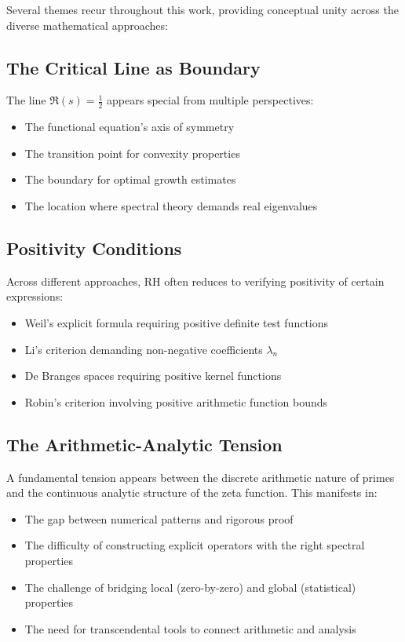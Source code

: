 Several themes recur throughout this work, providing conceptual unity across the diverse mathematical approaches:

\subsection*{The Critical Line as Boundary}

The line $\Re(s) = \frac{1}{2}$ appears special from multiple perspectives:
\begin{itemize}
\item The functional equation's axis of symmetry
\item The transition point for convexity properties
\item The boundary for optimal growth estimates
\item The location where spectral theory demands real eigenvalues
\end{itemize}

\subsection*{Positivity Conditions}

Across different approaches, RH often reduces to verifying positivity of certain expressions:
\begin{itemize}
\item Weil's explicit formula requiring positive definite test functions
\item Li's criterion demanding non-negative coefficients $\lambda_n$
\item De Branges spaces requiring positive kernel functions
\item Robin's criterion involving positive arithmetic function bounds
\end{itemize}

\subsection*{The Arithmetic-Analytic Tension}

A fundamental tension appears between the discrete arithmetic nature of primes and the continuous analytic structure of the zeta function. This manifests in:
\begin{itemize}
\item The gap between numerical patterns and rigorous proof
\item The difficulty of constructing explicit operators with the right spectral properties
\item The challenge of bridging local (zero-by-zero) and global (statistical) properties
\item The need for transcendental tools to connect arithmetic and analysis
\end{itemize}

